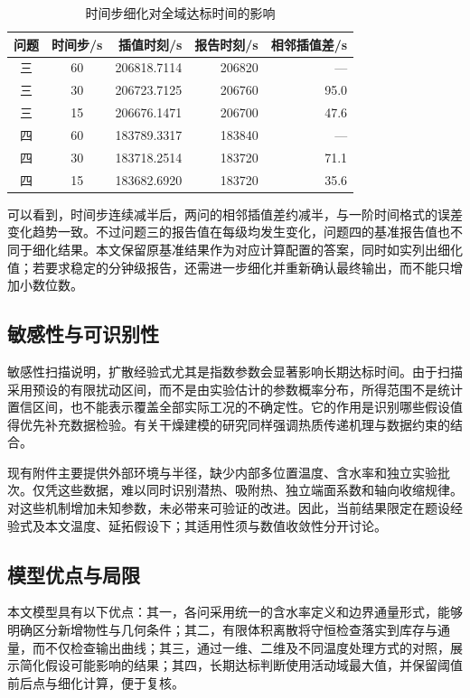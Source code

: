 \documentclass[withoutpreface,bwprint]{cumcmthesis}
\begin{document}
\begin{table}[htbp]
\centering\caption{时间步细化对全域达标时间的影响}\label{tab:time-check}
\begin{tabular}{ccrrr}
\toprule
问题 & 时间步/s & 插值时刻/s & 报告时刻/s & 相邻插值差/s\\
\midrule
三 & 60 & 206818.7114 & 206820 & ---\\
三 & 30 & 206723.7125 & 206760 & 95.0\\
三 & 15 & 206676.1471 & 206700 & 47.6\\
\midrule
四 & 60 & 183789.3317 & 183840 & ---\\
四 & 30 & 183718.2514 & 183720 & 71.1\\
四 & 15 & 183682.6920 & 183720 & 35.6\\
\bottomrule
\end{tabular}
\end{table}

可以看到，时间步连续减半后，两问的相邻插值差约减半，与一阶时间格式的误差变化趋势一致。不过问题三的报告值在每级均发生变化，问题四的基准报告值也不同于细化结果。本文保留原基准结果作为对应计算配置的答案，同时如实列出细化值；若要求稳定的分钟级报告，还需进一步细化并重新确认最终输出，而不能只增加小数位数。

\subsection{敏感性与可识别性}

敏感性扫描说明，扩散经验式尤其是指数参数会显著影响长期达标时间。由于扫描采用预设的有限扰动区间，而不是由实验估计的参数概率分布，所得范围不是统计置信区间，也不能表示覆盖全部实际工况的不确定性。它的作用是识别哪些假设值得优先补充数据检验。有关干燥建模的研究同样强调热质传递机理与数据约束的结合\cite{p11}。

现有附件主要提供外部环境与半径，缺少内部多位置温度、含水率和独立实验批次。仅凭这些数据，难以同时识别潜热、吸附热、独立端面系数和轴向收缩规律。对这些机制增加未知参数，未必带来可验证的改进。因此，当前结果限定在题设经验式及本文温度、延拓假设下；其适用性须与数值收敛性分开讨论。

\subsection{模型优点与局限}

本文模型具有以下优点：其一，各问采用统一的含水率定义和边界通量形式，能够明确区分新增物性与几何条件；其二，有限体积离散将守恒检查落实到库存与通量，而不仅检查输出曲线；其三，通过一维、二维及不同温度处理方式的对照，展示简化假设可能影响的结果；其四，长期达标判断使用活动域最大值，并保留阈值前后点与细化计算，便于复核。
\end{document}
